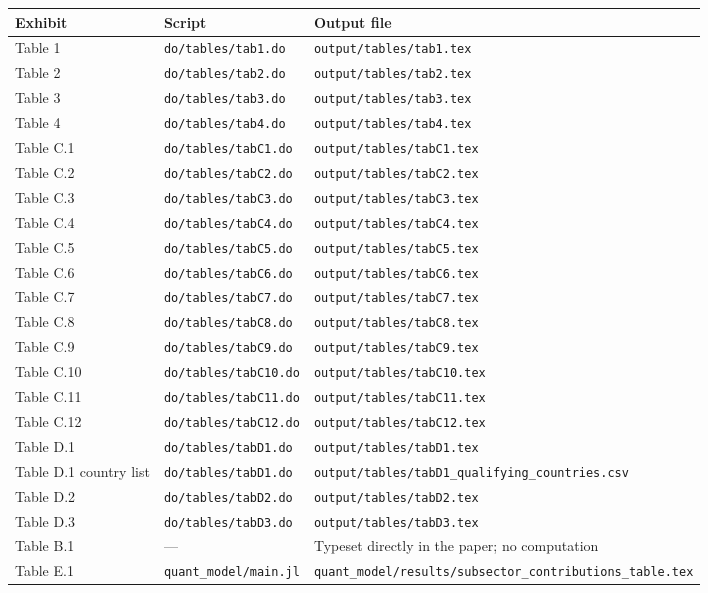 \documentclass[11pt]{article}
\newcommand{\pkgfile}[1]{\nolinkurl{#1}}
\begin{document}
\begin{longtable}{@{}>{\raggedright\arraybackslash}p{2.4cm}>{\raggedright\arraybackslash}p{5.0cm}>{\raggedright\arraybackslash}p{7.3cm}@{}}
\toprule
\textbf{Exhibit} & \textbf{Script} & \textbf{Output file}\\
\midrule
\endhead
Table 1 & \pkgfile{do/tables/tab1.do} & \pkgfile{output/tables/tab1.tex}\\
Table 2 & \pkgfile{do/tables/tab2.do} & \pkgfile{output/tables/tab2.tex}\\
Table 3 & \pkgfile{do/tables/tab3.do} & \pkgfile{output/tables/tab3.tex}\\
Table 4 & \pkgfile{do/tables/tab4.do} & \pkgfile{output/tables/tab4.tex}\\
Table C.1 & \pkgfile{do/tables/tabC1.do} & \pkgfile{output/tables/tabC1.tex}\\
Table C.2 & \pkgfile{do/tables/tabC2.do} & \pkgfile{output/tables/tabC2.tex}\\
Table C.3 & \pkgfile{do/tables/tabC3.do} & \pkgfile{output/tables/tabC3.tex}\\
Table C.4 & \pkgfile{do/tables/tabC4.do} & \pkgfile{output/tables/tabC4.tex}\\
Table C.5 & \pkgfile{do/tables/tabC5.do} & \pkgfile{output/tables/tabC5.tex}\\
Table C.6 & \pkgfile{do/tables/tabC6.do} & \pkgfile{output/tables/tabC6.tex}\\
Table C.7 & \pkgfile{do/tables/tabC7.do} & \pkgfile{output/tables/tabC7.tex}\\
Table C.8 & \pkgfile{do/tables/tabC8.do} & \pkgfile{output/tables/tabC8.tex}\\
Table C.9 & \pkgfile{do/tables/tabC9.do} & \pkgfile{output/tables/tabC9.tex}\\
Table C.10 & \pkgfile{do/tables/tabC10.do} & \pkgfile{output/tables/tabC10.tex}\\
Table C.11 & \pkgfile{do/tables/tabC11.do} & \pkgfile{output/tables/tabC11.tex}\\
Table C.12 & \pkgfile{do/tables/tabC12.do} & \pkgfile{output/tables/tabC12.tex}\\
Table D.1 & \pkgfile{do/tables/tabD1.do} & \pkgfile{output/tables/tabD1.tex}\\
Table D.1 country list & \pkgfile{do/tables/tabD1.do} & \pkgfile{output/tables/tabD1_qualifying_countries.csv}\\
Table D.2 & \pkgfile{do/tables/tabD2.do} & \pkgfile{output/tables/tabD2.tex}\\
Table D.3 & \pkgfile{do/tables/tabD3.do} & \pkgfile{output/tables/tabD3.tex}\\
\addlinespace
Table B.1 & --- & Typeset directly in the paper; no computation\\
Table E.1 & \pkgfile{quant_model/main.jl} & \pkgfile{quant_model/results/subsector_contributions_table.tex}\\
\bottomrule
\end{longtable}
\end{document}
